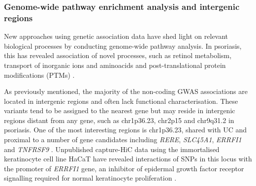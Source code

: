 \subsubsection{Genome-wide pathway enrichment analysis and intergenic regions}

New approaches using genetic association data have shed light on relevant biological processes by conducting genome-wide pathway analysis. %
In psoriasis, this has revealed association of novel processes, such as retinol metabolism, transport of inorganic ions and aminoacids and post-translational protein modifications (PTMs) \parencite{Aterido2016}. 

As previously mentioned, the majority of the non-coding GWAS associations are located in intergenic regions and often lack functional characterisation. These variants tend to be assigned to the nearest gene but may reside in intergenic regions distant from any gene, such as chr1p36.23, chr2p15 and chr9q31.2 in psoriasis. One of the most interesting regions is chr1p36.23, shared with UC and proximal to a number of gene candidates including \textit{RERE}, \textit{SLC45A1}, \textit{ERRFI1} and \textit{TNFRSF9} \parencite{Tsoi2012}. Unpublished capture-HiC data using the immortalised keratinocyte cell line HaCaT have revealed interactions of SNPs in this locus with the promoter of  \textit{ERRFI1} gene, an inhibitor of epidermal growth factor receptor signalling required for normal keratinocyte proliferation \parencite{Ray-Jones2017}. %

 
